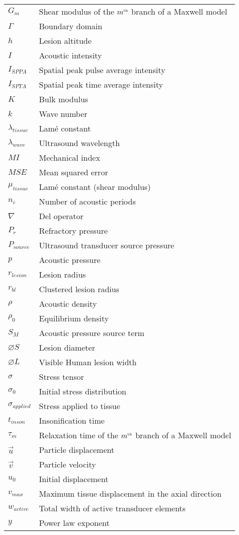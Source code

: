 \begin{longtable}[l]{ll}
			$G_m$ & Shear modulus of the $m^{\text{\tiny th}}$ branch of a Maxwell model \\
			$\Gamma$ & Boundary domain \\
			$h$ & Lesion altitude \\
			$I$ & Acoustic intensity \\
			$I_{SPPA}$ & Spatial peak pulse average intensity \\
			$I_{SPTA}$ & Spatial peak time average intensity \\
			$K$ & Bulk modulus \\
			$k$ & Wave number \\
			$\lambda_{tissue}$ & Lam\'{e} constant \\
			$\lambda_{wave}$ & Ultrasound wavelength \\
			$MI$ & Mechanical index \\
			$MSE$ & Mean squared error \\
			$\mu_{tissue}$ & Lam\'{e} constant (shear modulus) \\
			$n_c$ & Number of acoustic periods \\
			$\nabla$ & Del operator \\
			$P_r$ & Refractory pressure \\
			$P_{source}$ & Ultrasound transducer source pressure \\
			$p$ & Acoustic pressure \\
			$r_{lesion}$ & Lesion radius \\
			$r_{bl}$ & Clustered lesion radius \\
			$\rho$ & Acoustic density \\
			$\rho_0$ & Equilibrium density \\
			$S_M$ & Acoustic pressure source term \\
			$\diameter S$ & Lesion diameter \\
			$\diameter L$ & Visible Human lesion width \\
			$\sigma$ & Stress tensor \\
			$\sigma_0$ & Initial stress distribution \\
			$\sigma_{applied}$ & Stress applied to tissue \\
			$t_{inson}$ & Insonification time \\
			$\tau_m$ & Relaxation time of the $m^{\text{\tiny th}}$ branch of a Maxwell model \\
			$\vec{u}$ & Particle displacement \\
			$\vec{v}$ & Particle velocity \\
			$u_0$ & Initial displacement \\
			$v_{max}$ & Maximum tissue displacement in the axial direction \\
			$w_{active}$ & Total width of active transducer elements \\
			$y$ & Power law exponent \\
		\end{longtable}

